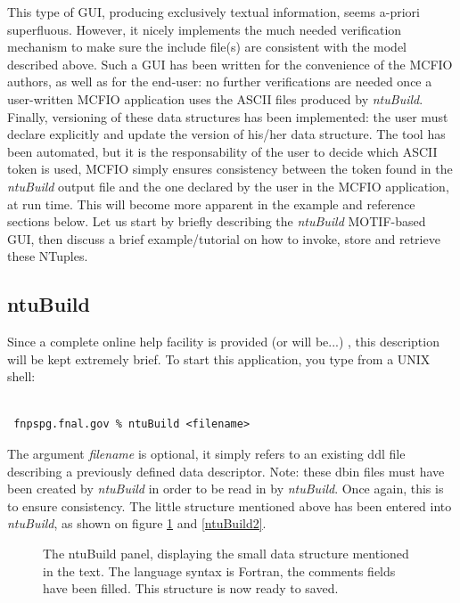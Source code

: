 This type of GUI, producing exclusively  textual information,  seems a-priori
superfluous. However, it nicely implements the much needed verification
mechanism to make sure the include file(s) are consistent with the model
described above.  Such a GUI has been written  for the convenience of the MCFIO
authors, as well as for the end-user: no further verifications are needed once a
user-written MCFIO application uses the ASCII files produced by {\em
ntuBuild}. Finally, versioning of these data structures has been implemented:
the user must declare explicitly and update the version of his/her data
structure. The tool has been automated, but it is the responsability of the
user to decide which ASCII token is used, MCFIO simply ensures consistency
between the token found in the {\em ntuBuild} output file and the one declared
by the user in the MCFIO application, at run time.  This
will become more apparent in the example and reference  sections below.  Let us
start by briefly describing the {\em ntuBuild} MOTIF-based GUI, then discuss a
brief example/tutorial on how to invoke, store and retrieve these NTuples.

\subsection{ntuBuild}

Since a complete online help facility is provided (or will be...) , this description will be kept
extremely brief.  To start this application, you  type  from a UNIX shell:
\begin{verbatim}

 fnpspg.fnal.gov % ntuBuild <filename>

\end{verbatim}

	The argument {\em filename} is optional, it simply refers to an
existing ddl file describing a previously defined data descriptor. Note:
these dbin files must have been created by {\em ntuBuild} in order to be read
 in by {\em ntuBuild}.  Once again, this is to ensure consistency.  The little
 structure mentioned above has been entered into {\em ntuBuild}, as shown
 on figure \ref{ntuBuild1} and \ref{ntuBuild2}.

\begin{figure}
\begin{center}
\leavevmode
\epsfysize=300pt
\caption{The ntuBuild panel, displaying the small data structure mentioned
in the text. The language syntax is Fortran, the comments fields have been
filled.  This structure is now ready to saved.}
\label{ntuBuild1}
\end{center}
\end{figure}


